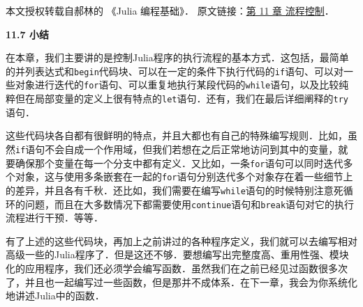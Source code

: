 
本文授权转载自郝林的 《Julia 编程基础》． 原文链接：\href{https://github.com/hyper0x/JuliaBasics/blob/master/book/ch11.md}{第 11 章 流程控制}．


\textbf{11.7 小结}

在本章，我们主要讲的是控制Julia程序的执行流程的基本方式．这包括，最简单的并列表达式和\verb|begin|代码块、可以在一定的条件下执行代码的\verb|if|语句、可以对一些对象进行迭代的\verb|for|语句、可以重复地执行某段代码的\verb|while|语句，以及比较纯粹但在局部变量的定义上很有特点的\verb|let|语句．还有，我们在最后详细阐释的\verb|try|语句．

这些代码块各自都有很鲜明的特点，并且大都也有自己的特殊编写规则．比如，虽然\verb|if|语句不会自成一个作用域，但我们若想在之后正常地访问到其中的变量，就要确保那个变量在每一个分支中都有定义．又比如，一条\verb|for|语句可以同时迭代多个对象，这与使用多条嵌套在一起的\verb|for|语句分别迭代多个对象存在着一些细节上的差异，并且各有千秋．还比如，我们需要在编写\verb|while|语句的时候特别注意死循环的问题，而且在大多数情况下都需要使用\verb|continue|语句和\verb|break|语句对它的执行流程进行干预．等等．

有了上述的这些代码块，再加上之前讲过的各种程序定义，我们就可以去编写相对高级一些的Julia程序了．但是这还不够．要想编写出完整度高、重用性强、模块化的应用程序，我们还必须学会编写函数．虽然我们在之前已经见过函数很多次了，并且也一起编写过一些函数，但是那并不成体系．在下一章，我会为你系统化地讲述Julia中的函数．